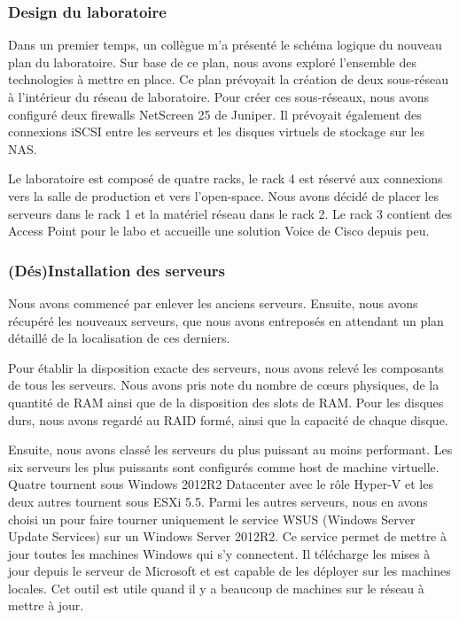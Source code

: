 \subsubsection{Design du laboratoire}
Dans un premier temps, un collègue m'a présenté le schéma logique du nouveau plan du laboratoire.
Sur base de ce plan, nous avons exploré l'ensemble des technologies à mettre en place.
Ce plan prévoyait la création de deux sous-réseau à l'intérieur du réseau de laboratoire.
Pour créer ces sous-réseaux, nous avons configuré deux firewalls NetScreen 25 de Juniper. 
Il prévoyait également des connexions iSCSI entre les serveurs et les disques virtuels de stockage sur les NAS.

Le laboratoire est composé de quatre racks, le rack 4 est réservé aux connexions vers la salle de production et vers l'open-space.
Nous avons décidé de placer les serveurs dans le rack 1 et la matériel réseau dans le rack 2.
Le rack 3 contient des Access Point pour le labo et accueille une solution Voice de Cisco depuis peu.

\subsubsection{(Dés)Installation des serveurs}
Nous avons commencé par enlever les anciens serveurs.
Ensuite, nous avons récupéré les nouveaux serveurs, que nous avons entreposés en attendant un plan détaillé de la localisation de ces derniers.

Pour établir la disposition exacte des serveurs, nous avons relevé les composants de tous les serveurs.
Nous avons pris note du nombre de cœurs physiques, de la quantité de RAM ainsi que de la disposition des slots de RAM.
Pour les disques durs, nous avons regardé au RAID formé, ainsi que la capacité de chaque disque.

Ensuite, nous avons classé les serveurs du plus puissant au moins performant. 
Les six serveurs les plus puissants sont configurés comme host de machine virtuelle. 
Quatre tournent sous Windows 2012R2 Datacenter avec le rôle Hyper-V et les deux autres tournent sous ESXi 5.5.
Parmi les autres serveurs, nous en avons choisi un pour faire tourner uniquement le service WSUS (Windows Server Update Services) sur un Windows Server 2012R2. 
Ce service permet de mettre à jour toutes les machines Windows qui s'y connectent.
Il télécharge les mises à jour depuis le serveur de Microsoft et est capable de les déployer sur les machines locales.
Cet outil est utile quand il y a beaucoup de machines sur le réseau à mettre à jour. 

